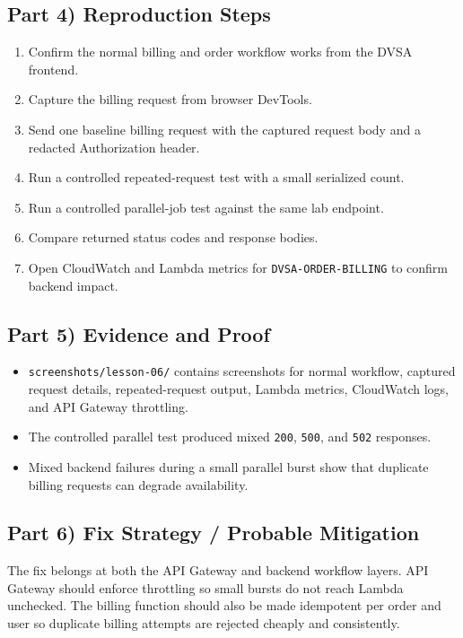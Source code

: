 \documentclass[12pt]{article}
\begin{document}
\subsection*{Part 4) Reproduction Steps}
\begin{enumerate}
\item Confirm the normal billing and order workflow works from the DVSA frontend.
\item Capture the billing request from browser DevTools.
\item Send one baseline billing request with the captured request body and a redacted Authorization header.
\item Run a controlled repeated-request test with a small serialized count.
\item Run a controlled parallel-job test against the same lab endpoint.
\item Compare returned status codes and response bodies.
\item Open CloudWatch and Lambda metrics for \texttt{DVSA-ORDER-BILLING} to confirm backend impact.
\end{enumerate}

\subsection*{Part 5) Evidence and Proof}
\begin{itemize}
\item \texttt{screenshots/lesson-06/} contains screenshots for normal workflow, captured request details, repeated-request output, Lambda metrics, CloudWatch logs, and API Gateway throttling.
\item The controlled parallel test produced mixed \texttt{200}, \texttt{500}, and \texttt{502} responses.
\item Mixed backend failures during a small parallel burst show that duplicate billing requests can degrade availability.
\end{itemize}

\subsection*{Part 6) Fix Strategy / Probable Mitigation}
The fix belongs at both the API Gateway and backend workflow layers. API Gateway should enforce throttling so small bursts do not reach Lambda unchecked. The billing function should also be made idempotent per order and user so duplicate billing attempts are rejected cheaply and consistently.
\end{document}
